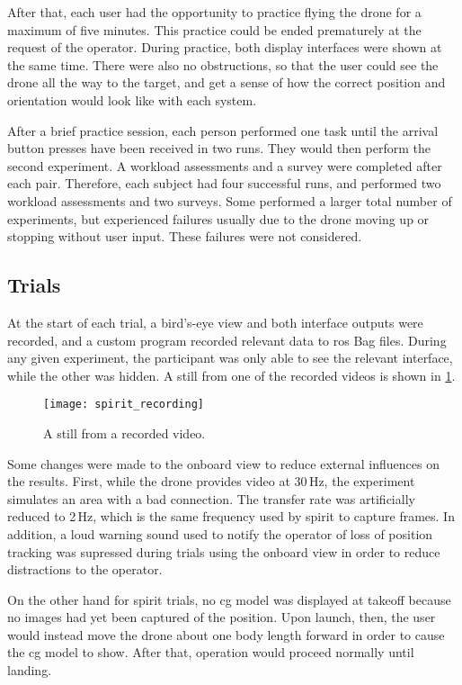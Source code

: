 After that, each user had the opportunity to practice flying the drone for a maximum of five minutes.
This practice could be ended prematurely at the request of the operator.
During practice, both display interfaces were shown at the same time.
There were also no obstructions, so that the user could see the drone all the way to the target, and get a sense of how the correct position and orientation would look like with each system.

After a brief practice session, each person performed one task until the arrival button presses have been received in two runs.
They would then perform the second experiment.
A workload assessments and a survey were completed  after each pair.
Therefore, each subject had four successful runs, and performed two workload assessments and two surveys.
Some performed a larger total number of experiments, but experienced failures usually due to the drone moving up or stopping without user input.
These failures were not considered.

\subsection{Trials}
At the start of each trial, a bird's-eye view and both interface outputs were recorded, and a custom program recorded relevant data to \gls{ros} Bag files.
During any given experiment, the participant was only able to see the relevant interface, while the other was hidden.
A still from one of the recorded videos is shown in \ref{fig:obs}.

\begin{figure}[h]
  \centering
  \texttt{[image: spirit\_recording]}
  \caption[Recording sample]{A still from a recorded video.}
  \label{fig:obs}
\end{figure}

Some changes were made to the onboard view to reduce external influences on the results.  
First, while the drone provides video at 30\,Hz, the experiment simulates an area with a bad connection.
The transfer rate was artificially reduced to 2\,Hz, which is the same frequency used by \gls{spirit} to capture frames.
In addition, a loud warning sound used to notify the operator of loss of position tracking was supressed during trials using the onboard view in order to reduce distractions to the operator.

On the other hand for \gls{spirit} trials, no \gls{cg} model was displayed at takeoff because no images had yet been captured of the position.
Upon launch, then, the user would instead move the drone about one body length forward in order to cause the \gls{cg} model to show.
After that, operation would proceed normally until landing.

